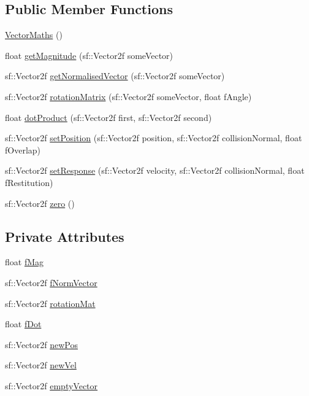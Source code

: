 \subsection*{Public Member Functions}
\begin{DoxyCompactItemize}
\item 
\hyperlink{class_vector_maths_af14f2937b1a287972ae741082c63e6e2}{Vector\+Maths} ()
\item 
float \hyperlink{class_vector_maths_ac32142cb1d6a374e3808842c42aad1bf}{get\+Magnitude} (sf\+::\+Vector2f some\+Vector)
\item 
sf\+::\+Vector2f \hyperlink{class_vector_maths_a2958671bb1fabcaa012fa7a96764f0c3}{get\+Normalised\+Vector} (sf\+::\+Vector2f some\+Vector)
\item 
sf\+::\+Vector2f \hyperlink{class_vector_maths_abf04ac83d6af1aff50447fc3e9a510da}{rotation\+Matrix} (sf\+::\+Vector2f some\+Vector, float f\+Angle)
\item 
float \hyperlink{class_vector_maths_a53b54c300f657d8eb0859b9456c4fd40}{dot\+Product} (sf\+::\+Vector2f first, sf\+::\+Vector2f second)
\item 
sf\+::\+Vector2f \hyperlink{class_vector_maths_af669b52c8b757560e8c7d1af263acbf4}{set\+Position} (sf\+::\+Vector2f position, sf\+::\+Vector2f collision\+Normal, float f\+Overlap)
\item 
sf\+::\+Vector2f \hyperlink{class_vector_maths_a3e5d8270e32fb2985657e05ff20a3e57}{set\+Response} (sf\+::\+Vector2f velocity, sf\+::\+Vector2f collision\+Normal, float f\+Restitution)
\item 
sf\+::\+Vector2f \hyperlink{class_vector_maths_a100430d2798e19d383c68cae5f3a35ec}{zero} ()
\end{DoxyCompactItemize}
\subsection*{Private Attributes}
\begin{DoxyCompactItemize}
\item 
float \hyperlink{class_vector_maths_a500410fcab46699e06a8b7dadf56771d}{f\+Mag}
\item 
sf\+::\+Vector2f \hyperlink{class_vector_maths_a28a7d7f8fc60f6c0b35e7896a5ec48d5}{f\+Norm\+Vector}
\item 
sf\+::\+Vector2f \hyperlink{class_vector_maths_ae07f69982afee9ac9532c70e4bcde1d3}{rotation\+Mat}
\item 
float \hyperlink{class_vector_maths_a1f152ea5bd11ef07643bea0de8d2a75c}{f\+Dot}
\item 
sf\+::\+Vector2f \hyperlink{class_vector_maths_abc596252a016b278d89649aa84a788f6}{new\+Pos}
\item 
sf\+::\+Vector2f \hyperlink{class_vector_maths_a00513ada0f74184f044eb6fc35aa4a85}{new\+Vel}
\item 
sf\+::\+Vector2f \hyperlink{class_vector_maths_a701ff35f136062ae5e43b76e5f39c3e3}{empty\+Vector}
\end{DoxyCompactItemize}


